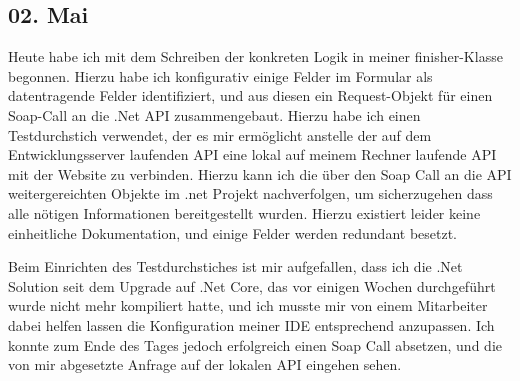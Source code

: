 \subsection{02. Mai}
Heute habe ich mit dem Schreiben der konkreten Logik in meiner finisher-Klasse begonnen. Hierzu habe ich konfigurativ einige Felder im Formular als datentragende Felder identifiziert, und aus diesen ein Request-Objekt für einen Soap-Call an die .Net API zusammengebaut. Hierzu habe ich einen Testdurchstich verwendet, der es mir ermöglicht anstelle der auf dem Entwicklungsserver laufenden API eine lokal auf meinem Rechner laufende API mit der Website zu verbinden. Hierzu kann ich die über den Soap Call an die API weitergereichten Objekte im .net Projekt nachverfolgen, um sicherzugehen dass alle nötigen Informationen bereitgestellt wurden. Hierzu existiert leider keine einheitliche Dokumentation, und einige Felder werden redundant besetzt.

Beim Einrichten des Testdurchstiches ist mir aufgefallen, dass ich die .Net Solution seit dem Upgrade auf .Net Core, das vor einigen Wochen durchgeführt wurde nicht mehr kompiliert hatte, und ich musste mir von einem Mitarbeiter dabei helfen lassen die Konfiguration meiner IDE entsprechend anzupassen. Ich konnte zum Ende des Tages jedoch erfolgreich einen Soap Call absetzen, und die von mir abgesetzte Anfrage auf der lokalen API eingehen sehen.
